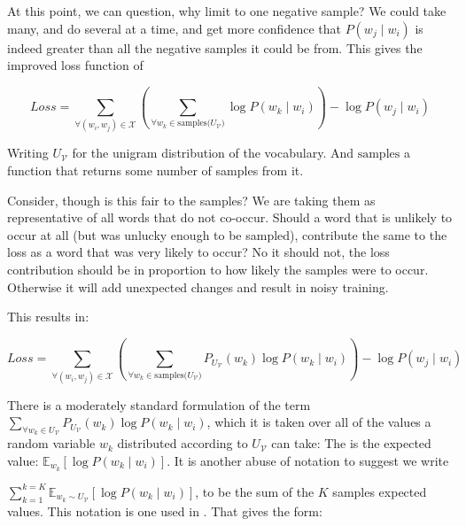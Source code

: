 \documentclass[parskip]{komatufte}
\begin{document}

At this point, we can question, why limit to one negative sample?
We could take many, and do several at a time,
and get more confidence that $P(w_j\mid w_i)$ is indeed greater than all the negative samples it could be from.
This gives the improved loss function of 

\begin{equation}
Loss = \sum_{\forall (w_i,w_j)\in \mathcal{X}} 
\left(\sum_{\forall w_k \in \text{samples($U_{\mathcal{V}}$)}}
 \log P(w_k\mid w_i) \right) 
 -\log P(w_j\mid w_i)
\end{equation}

Writing $U_{\mathcal{V}}$ for the unigram distribution of the vocabulary.
And $\text{samples}$ a function that returns some number of samples from it.

Consider, though is this fair to the samples?
We are taking them as representative of all words that do not co-occur.
Should a word that is unlikely to occur at all (but was unlucky enough to be sampled), contribute the same to the loss as a word that was very likely to occur?
No it should not, the loss contribution should be in proportion to how likely the samples were to occur.
Otherwise it will add unexpected changes and result in noisy training.

This results in:

\begin{equation}
Loss = \sum_{\forall (w_i,w_j)\in \mathcal{X}} 
\left(\sum_{\forall w_k \in \text{samples($U_{\mathcal{V}}$)}}
P_{U_\mathcal{V}}(w_k) \log P(w_k\mid w_i) \right)
-\log P(w_j\mid w_i)
\end{equation}

There is a moderately standard formulation of the term $\sum_{\forall w_k \in U_{\mathcal{V}}}
P_{U_\mathcal{V}}(w_k) \log P(w_k\mid w_i)$,
which it is taken over all of the values a random variable $w_k$  distributed according to $U_{\mathcal{V}}$ can take:
The is the expected value: $\mathbb{E}_{w_k} [\log P(w_k\mid w_i)]$.
It is another abuse of notation to suggest we write

$\sum_{k=1}^{k=K} \mathbb{E}_{w_k \sim U_{\mathcal{V}}} [\log P(w_k\mid w_i)]$,
to be the sum of the $K$ samples expected values.
This notation is one used in .
That gives the form:
\end{document}
